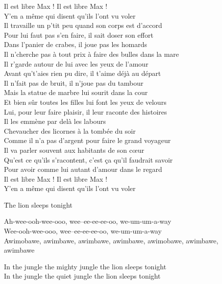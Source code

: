 \documentclass{novel}
\begin{document}
Il est libre Max ! Il est libre Max !\\
Y'en a même qui disent qu'ils l'ont vu voler\\

Il travaille un p'tit peu quand son corps est d'accord\\
Pour lui faut pas s'en faire, il sait doser son effort\\
Dans l'panier de crabes, il joue pas les homards\\
Il n'cherche pas à tout prix à faire des bulles dans la mare\\

Il r'garde autour de lui avec les yeux de l'amour\\
Avant qu't'aies rien pu dire, il t'aime déjà au départ\\
Il n'fait pas de bruit, il n'joue pas du tambour\\
Mais la statue de marbre lui sourit dans la cour\\

Et bien sûr toutes les filles lui font les yeux de velours\\
Lui, pour leur faire plaisir, il leur raconte des histoires\\
Il les emmène par delà les labours\\
Chevaucher des licornes à la tombée du soir\\

Comme il n'a pas d'argent pour faire le grand voyageur\\
Il va parler souvent aux habitants de son cœur\\
Qu'est ce qu'ils s'racontent, c'est ça qu'il faudrait savoir\\
Pour avoir comme lui autant d'amour dans le regard\\

Il est libre Max ! Il est libre Max !\\
Y'en a même qui disent qu'ils l'ont vu voler

\newpage
\Large
\h*{The lion sleeps tonight}

Ah-wee-ooh-wee-ooo, wee--ee-ee-ee-oo, we-um-um-a-way\\
Wee-ooh-wee-ooo, wee--ee-ee-ee-oo, we-um-um-a-way\\

Awimobawe, awimbawe, awimbawe, awimbawe, awimobawe, awimbawe, awimbawe

In the jungle the mighty jungle the lion sleeps tonight\\
In the jungle the quiet jungle the lion sleeps tonight
\end{document}
